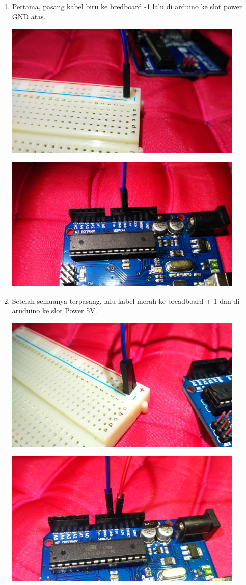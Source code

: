 \documentclass{article}
\begin{document}
\begin{enumerate}
	
	\item  Pertama, pasang kabel biru ke bredboard -1 lalu di arduino ke slot power GND atas.
	\break
	\centerline{\includegraphics[width=0.9\textwidth]{figures/1.jpg}}
	\break
	\centerline{\includegraphics[width=0.9\textwidth]{figures/2.jpg}}
	\break
	\item Setelah semuanya terpasang, lalu kabel merah ke breadboard + 1 dan di aruduino ke slot Power 5V.
	\break
	\centerline{\includegraphics[width=0.9\textwidth]{figures/3.jpg}}
	\break
	\centerline{\includegraphics[width=0.9\textwidth]{figures/4.jpg}}

\end{enumerate}
\end{document}
